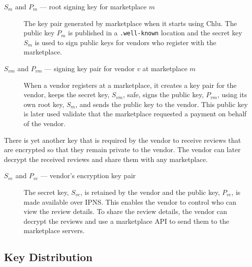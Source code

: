 \documentclass[a4paper]{article}
\begin{document}
\begin{description}
  
\item[$S_{m}$ and $P_{m}$ --- root signing key for marketplace $m$]
  The key pair generated by marketplace when it starts using Chlu. The
  public key $P_m$ is published in a \texttt{.well-known} location and
  the secret key $S_m$ is used to sign public keys for vendors who
  register with the marketplace.

\end{description}


\begin{description}
  
\item[$S_{vm}$ and $P_{vm}$ --- signing key pair for vendor $v$ at
  marketplace $m$] When a vendor registers at a marketplace, it
  creates a key pair for the vendor, keeps the secret key, $S_{vm}$,
  safe, signs the public key, $P_{vm}$, using its own root key,
  $S_{m}$, and sends the public key to the vendor. This public key is
  later used validate that the marketplace requested a payment on
  behalf of the vendor.

\end{description}

There is yet another key that is required by the vendor to receive
reviews that are encrypted so that they remain private to the
vendor. The vendor can later decrypt the received reviews and share
them with any marketplace.

\begin{description}
  
\item[$S_{ve}$ and $P_{ve}$ --- vendor's encryption key pair] The
  secret key, $S_{ve}$, is retained by the vendor and the public key,
  $P_{ve}$, is made available over IPNS\cite{ipfs}. This enables the
  vendor to control who can view the review details. To share the
  review details, the vendor can decrypt the reviews and use a
  marketplace API to send them to the marketplace servers.
  
\end{description}


\subsection{Key Distribution}\label{sec:key-distribution}
\end{document}
